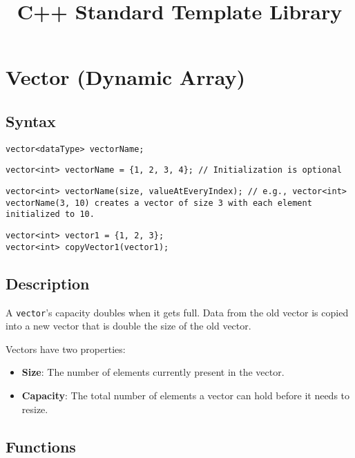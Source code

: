 \documentclass{article}
\title{C++ Standard Template Library}
\author{}
\date{}
\begin{document}
\maketitle

\section{Vector (Dynamic Array)}

\subsection{Syntax}

\begin{lstlisting}
vector<dataType> vectorName; 
\end{lstlisting}

\begin{lstlisting}
vector<int> vectorName = {1, 2, 3, 4}; // Initialization is optional
\end{lstlisting}

\begin{lstlisting}
vector<int> vectorName(size, valueAtEveryIndex); // e.g., vector<int> vectorName(3, 10) creates a vector of size 3 with each element initialized to 10.
\end{lstlisting}

\begin{lstlisting}
vector<int> vector1 = {1, 2, 3};
vector<int> copyVector1(vector1);
\end{lstlisting}

\subsection{Description}

A \texttt{vector}'s capacity doubles when it gets full. Data from the old vector is copied into a new vector that is double the size of the old vector.

\noindent Vectors have two properties:
\begin{itemize}
    \item \textbf{Size}: The number of elements currently present in the vector.
    \item \textbf{Capacity}: The total number of elements a vector can hold before it needs to resize.
\end{itemize}

\subsection{Functions}
\end{document}

